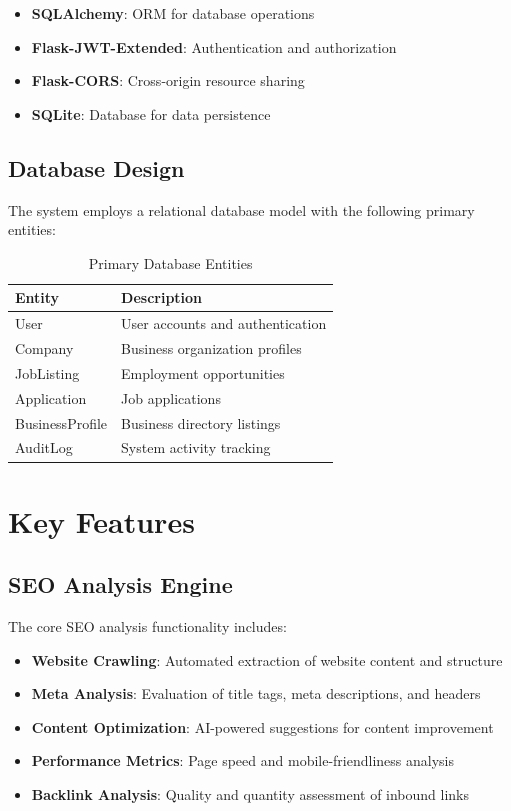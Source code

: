 \documentclass[11pt,a4paper]{article}
\begin{document}
\begin{itemize}
    \item \textbf{SQLAlchemy}: ORM for database operations
    \item \textbf{Flask-JWT-Extended}: Authentication and authorization
    \item \textbf{Flask-CORS}: Cross-origin resource sharing
    \item \textbf{SQLite}: Database for data persistence
\end{itemize}

\subsection{Database Design}
The system employs a relational database model with the following primary entities:

\begin{table}[h]
    \centering
    \begin{tabular}{ll}
        \toprule
        \textbf{Entity} & \textbf{Description} \\
        \midrule
        User & User accounts and authentication \\
        Company & Business organization profiles \\
        JobListing & Employment opportunities \\
        Application & Job applications \\
        BusinessProfile & Business directory listings \\
        AuditLog & System activity tracking \\
        \bottomrule
    \end{tabular}
    \caption{Primary Database Entities}
    \label{tab:entities}
\end{table}

\section{Key Features}
\label{sec:features}

\subsection{SEO Analysis Engine}
The core SEO analysis functionality includes:

\begin{itemize}
    \item \textbf{Website Crawling}: Automated extraction of website content and structure
    \item \textbf{Meta Analysis}: Evaluation of title tags, meta descriptions, and headers
    \item \textbf{Content Optimization}: AI-powered suggestions for content improvement
    \item \textbf{Performance Metrics}: Page speed and mobile-friendliness analysis
    \item \textbf{Backlink Analysis}: Quality and quantity assessment of inbound links
\end{itemize}
\end{document}
